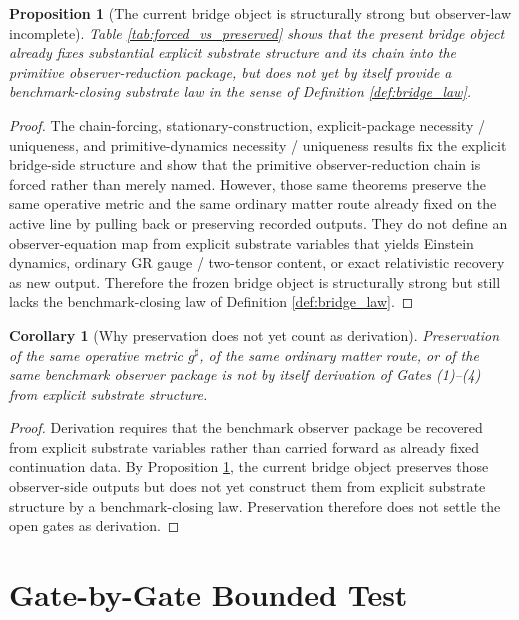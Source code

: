 \documentclass[11pt]{article}
\newcommand{\ObserverMetric}{g^{\sharp}}
\newtheorem{proposition}{Proposition}
\newtheorem{corollary}{Corollary}
\begin{document}
\begin{proposition}[The current bridge object is structurally strong but observer-law incomplete]
\label{prop:incomplete}
Table \ref{tab:forced_vs_preserved} shows that the present bridge object already fixes substantial explicit substrate structure and its chain into the primitive observer-reduction package, but does not yet by itself provide a benchmark-closing substrate law in the sense of Definition \ref{def:bridge_law}.
\end{proposition}

\begin{proof}
The chain-forcing, stationary-construction, explicit-package necessity / uniqueness, and primitive-dynamics necessity / uniqueness results fix the explicit bridge-side structure and show that the primitive observer-reduction chain is forced rather than merely named. However, those same theorems preserve the same operative metric and the same ordinary matter route already fixed on the active line by pulling back or preserving recorded outputs. They do not define an observer-equation map from explicit substrate variables that yields Einstein dynamics, ordinary GR gauge / two-tensor content, or exact relativistic recovery as new output. Therefore the frozen bridge object is structurally strong but still lacks the benchmark-closing law of Definition \ref{def:bridge_law}.
\end{proof}

\begin{corollary}[Why preservation does not yet count as derivation]
Preservation of the same operative metric \(\ObserverMetric\), of the same ordinary matter route, or of the same benchmark observer package is not by itself derivation of Gates (1)--(4) from explicit substrate structure.
\end{corollary}

\begin{proof}
Derivation requires that the benchmark observer package be recovered from explicit substrate variables rather than carried forward as already fixed continuation data. By Proposition \ref{prop:incomplete}, the current bridge object preserves those observer-side outputs but does not yet construct them from explicit substrate structure by a benchmark-closing law. Preservation therefore does not settle the open gates as derivation.
\end{proof}

\section{Gate-by-Gate Bounded Test}
\end{document}

